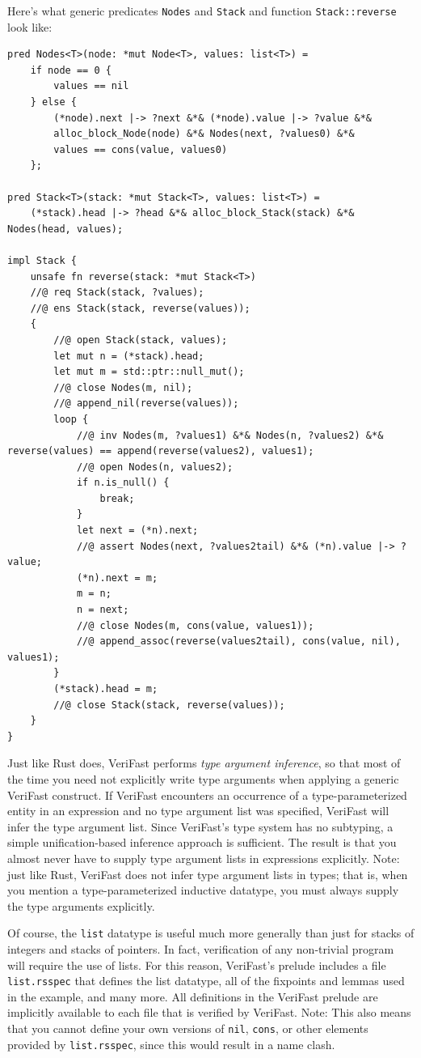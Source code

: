 \documentclass{article}
\begin{document}
Here's what generic predicates \lstinline!Nodes! and \lstinline!Stack!
and function \lstinline!Stack::reverse! look like:
\begin{lstlisting}
pred Nodes<T>(node: *mut Node<T>, values: list<T>) =
    if node == 0 {
        values == nil
    } else {
        (*node).next |-> ?next &*& (*node).value |-> ?value &*&
        alloc_block_Node(node) &*& Nodes(next, ?values0) &*&
        values == cons(value, values0)
    };

pred Stack<T>(stack: *mut Stack<T>, values: list<T>) =
    (*stack).head |-> ?head &*& alloc_block_Stack(stack) &*& Nodes(head, values);

impl Stack {
    unsafe fn reverse(stack: *mut Stack<T>)
    //@ req Stack(stack, ?values);
    //@ ens Stack(stack, reverse(values));
    {
        //@ open Stack(stack, values);
        let mut n = (*stack).head;
        let mut m = std::ptr::null_mut();
        //@ close Nodes(m, nil);
        //@ append_nil(reverse(values));
        loop {
            //@ inv Nodes(m, ?values1) &*& Nodes(n, ?values2) &*& reverse(values) == append(reverse(values2), values1);
            //@ open Nodes(n, values2);
            if n.is_null() {
                break;
            }
            let next = (*n).next;
            //@ assert Nodes(next, ?values2tail) &*& (*n).value |-> ?value;
            (*n).next = m;
            m = n;
            n = next;
            //@ close Nodes(m, cons(value, values1));
            //@ append_assoc(reverse(values2tail), cons(value, nil), values1);
        }
        (*stack).head = m;
        //@ close Stack(stack, reverse(values));
    }
}
\end{lstlisting}

Just like Rust does, VeriFast performs
\emph{type argument inference}, so that most of the time you need not explicitly write type arguments when applying a generic VeriFast construct. If VeriFast encounters an
occurrence of a type-parameterized entity in an expression and
no type argument list was specified, VeriFast will infer the
type argument list. Since VeriFast's type system has no
subtyping, a simple unification-based inference approach is
sufficient. The result is that you almost never have to supply
type argument lists in expressions explicitly. Note: just like Rust, VeriFast does not infer type argument lists in
types; that is, when you mention a type-parameterized inductive
datatype, you must always supply the type arguments explicitly.

Of course, the \lstinline!list! datatype is useful much more
generally than just for stacks of integers and stacks of
pointers. In fact, verification of any non-trivial program will
require the use of lists. For this reason, VeriFast's prelude
includes a file \verb|list.rsspec| that defines the list datatype,
all of the fixpoints and lemmas used in the example, and many
more. All definitions in the VeriFast prelude are implicitly available to each file that
is verified by VeriFast. Note: This also means that you cannot define your
own versions of \lstinline!nil!, \lstinline!cons!, or other
elements provided by \verb|list.rsspec|, since this would result in
a name clash.
\end{document}
